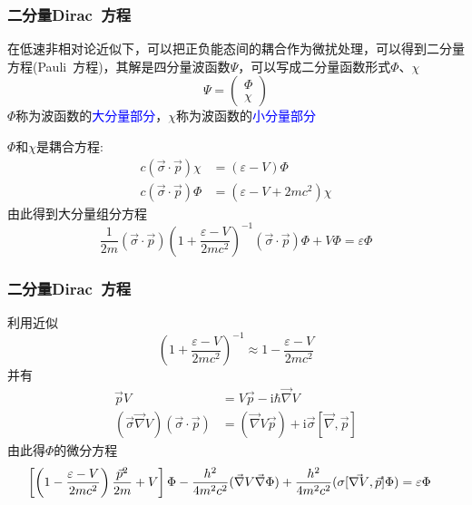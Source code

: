 \frame
{
	\frametitle{二分量\textrm{Dirac~}方程}
	在低速非相对论近似下，可以把正负能态间的耦合作为微扰处理，可以得到二分量方程(\textrm{Pauli~}方程)，其解是四分量波函数$\Psi$，可以写成二分量函数形式$\Phi$、$\chi$
	\begin{displaymath}
		\Psi=\left( 
		\begin{matrix}
			\Phi\\
			\chi
		\end{matrix}
		\right)
	\end{displaymath}
	$\Phi$称为波函数的\textcolor{blue}{大分量部分}，$\chi$称为波函数的\textcolor{blue}{小分量部分}

	$\Phi$和$\chi$是耦合方程:%
	\begin{displaymath}
		\begin{aligned}
			c(\vec{\sigma}\cdot\vec p)\chi&=(\varepsilon-V)\Phi\\
			c(\vec{\sigma}\cdot\vec p)\Phi&=(\varepsilon-V+2mc^2)\chi
		\end{aligned}
	\end{displaymath}
	由此得到大分量组分方程
	\begin{displaymath}
		\frac1{2m}(\vec{\sigma}\cdot\vec p)\left( 1+\frac{\varepsilon-V}{2mc^2} \right)^{-1}(\vec{\sigma}\cdot\vec p)\Phi+V\Phi=\varepsilon\Phi	
	\end{displaymath}
}

\frame
{
	\frametitle{二分量\textrm{Dirac~}方程}
	利用近似$$\left( 1+\frac{\varepsilon-V}{2mc^2} \right)^{-1}\approx1-\frac{\varepsilon-V}{2mc^2}$$
	并有
	\begin{displaymath}
		\begin{aligned}
			\vec pV&=V\vec p-\mathrm{i}\hbar\vec{\nabla}V\\
			(\vec{\sigma}\vec{\nabla}V)(\vec{\sigma}\cdot\vec p)&=(\vec{\nabla}V\vec p)+\mathrm{i}\vec{\sigma}[\vec{\nabla},\vec p]
		\end{aligned}
	\end{displaymath}
	由此得$\Phi$的微分方程
	\begin{displaymath}
		\hspace*{-10pt}	\left[ \left( 1-\frac{\varepsilon-V}{2mc^2} \right)\frac{\vec p^2}{2m}+V \right]\Phi-\frac{h^2}{4m^2c^2}(\vec{\nabla}V\vec{\nabla}\Phi)+\frac{h^2}{4m^2c^2}(\sigma[\vec{\nabla V},\vec p]\Phi)=\varepsilon\Phi
	\end{displaymath}
}

